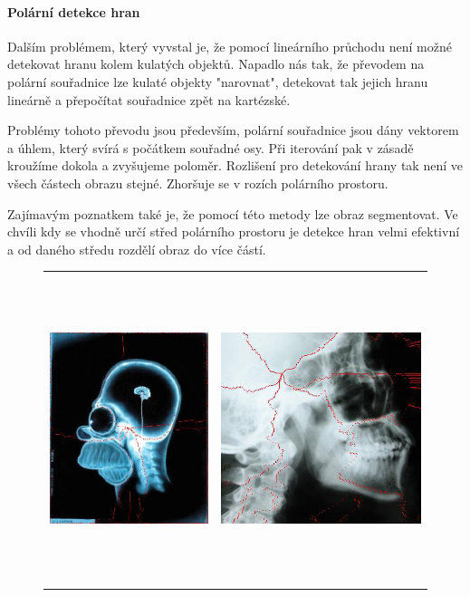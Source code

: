 \documentclass[12pt,a4paper,titlepage,final]{report}
\begin{document}
					

\paragraph{Polární detekce hran}

Dalším problémem, který vyvstal je, že pomocí lineárního průchodu není možné detekovat hranu kolem kulatých objektů. Napadlo nás tak, že převodem na polární souřadnice lze kulaté objekty "narovnat", detekovat tak jejich hranu lineárně a přepočítat souřadnice zpět na kartézské.

Problémy tohoto převodu jsou především, polární souřadnice jsou dány vektorem a úhlem, který svírá s počátkem souřadné osy. Při iterování pak v zásadě kroužíme dokola a zvyšujeme poloměr. Rozlišení pro detekování hrany tak není ve všech částech obrazu stejné. Zhoršuje se v rozích polárního prostoru.

Zajímavým poznatkem také je, že pomocí této metody lze obraz segmentovat. Ve chvíli kdy se vhodně určí střed polárního prostoru je detekce hran velmi efektivní a od daného středu rozdělí obraz do více částí.
\begin{figure}[ht]
\begin{center}
		\begin{tabular}{ll}
			\includegraphics[height=90mm]{images/homer-polar.jpg} &		
			\includegraphics[height=90mm]{images/skull.jpg}
		\end{tabular}
		\end{center}
\end{figure}
\end{document}

